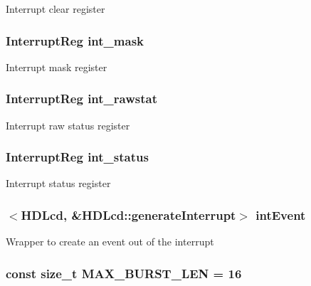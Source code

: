 \label{classHDLcd_ab96a978a299a4bf65839845c1c33f414}
Interrupt clear register \hypertarget{classHDLcd_a8343af5ba122012f4b5b3515d8675b7e}{
\subsubsection[{int\_\-mask}]{\setlength{\rightskip}{0pt plus 5cm}InterruptReg {\bf int\_\-mask}}}
\label{classHDLcd_a8343af5ba122012f4b5b3515d8675b7e}
Interrupt mask register \hypertarget{classHDLcd_af1d60d459d94a3bef2f6e83bdc4c1c43}{
\subsubsection[{int\_\-rawstat}]{\setlength{\rightskip}{0pt plus 5cm}InterruptReg {\bf int\_\-rawstat}}}
\label{classHDLcd_af1d60d459d94a3bef2f6e83bdc4c1c43}
Interrupt raw status register \hypertarget{classHDLcd_a814b02fed91486dd6000055cd1c43e1d}{
\subsubsection[{int\_\-status}]{\setlength{\rightskip}{0pt plus 5cm}InterruptReg {\bf int\_\-status}}}
\label{classHDLcd_a814b02fed91486dd6000055cd1c43e1d}
Interrupt status register \hypertarget{classHDLcd_a5ae08b242f478669f0686028d558332a}{
\subsubsection[{intEvent}]{$<${\bf HDLcd}, \&HDLcd::generateInterrupt$>$ {\bf intEvent}}}
\label{classHDLcd_a5ae08b242f478669f0686028d558332a}
Wrapper to create an event out of the interrupt \hypertarget{classHDLcd_aace62e6eea905bd83b1d848acf8e39c9}{
\subsubsection[{MAX\_\-BURST\_\-LEN}]{\setlength{\rightskip}{0pt plus 5cm}const size\_\-t {\bf MAX\_\-BURST\_\-LEN} = 16}}
